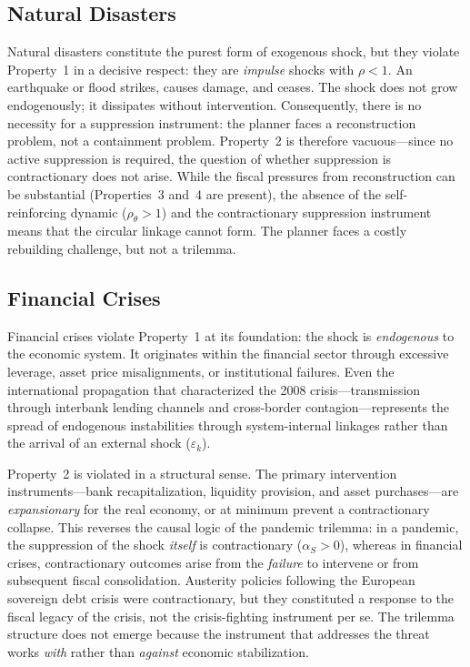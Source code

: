 \documentclass[12pt, a4paper]{article}
\begin{document}
\subsection*{Natural Disasters}

Natural disasters constitute the purest form of exogenous shock, but they violate Property~1 in a decisive respect: they are \textit{impulse} shocks with $\rho < 1$. An earthquake or flood strikes, causes damage, and ceases. The shock does not grow endogenously; it dissipates without intervention. Consequently, there is no necessity for a suppression instrument: the planner faces a reconstruction problem, not a containment problem. Property~2 is therefore vacuous---since no active suppression is required, the question of whether suppression is contractionary does not arise. While the fiscal pressures from reconstruction can be substantial (Properties~3 and~4 are present), the absence of the self-reinforcing dynamic ($\rho_\theta > 1$) and the contractionary suppression instrument means that the circular linkage cannot form. The planner faces a costly rebuilding challenge, but not a trilemma.

\subsection*{Financial Crises}

Financial crises violate Property~1 at its foundation: the shock is \textit{endogenous} to the economic system. It originates within the financial sector through excessive leverage, asset price misalignments, or institutional failures. Even the international propagation that characterized the 2008 crisis---transmission through interbank lending channels and cross-border contagion---represents the spread of endogenous instabilities through system-internal linkages rather than the arrival of an external shock ($\varepsilon_k$).

Property~2 is violated in a structural sense. The primary intervention instruments---bank recapitalization, liquidity provision, and asset purchases---are \textit{expansionary} for the real economy, or at minimum prevent a contractionary collapse. This reverses the causal logic of the pandemic trilemma: in a pandemic, the suppression of the shock \textit{itself} is contractionary ($\alpha_S > 0$), whereas in financial crises, contractionary outcomes arise from the \textit{failure} to intervene or from subsequent fiscal consolidation. Austerity policies following the European sovereign debt crisis were contractionary, but they constituted a response to the fiscal legacy of the crisis, not the crisis-fighting instrument per se. The trilemma structure does not emerge because the instrument that addresses the threat works \textit{with} rather than \textit{against} economic stabilization.
\end{document}
